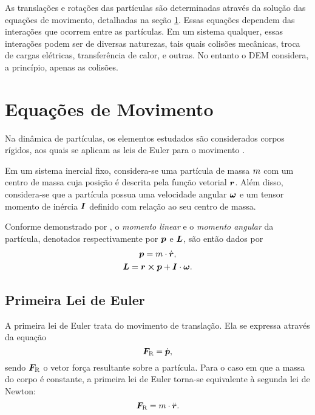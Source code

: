 As translações e rotações das partículas são determinadas através da solução das equações de movimento, detalhadas na seção \ref{sec:equations_of_motion}. Essas equações dependem das interações que ocorrem entre as partículas. Em um sistema qualquer, essas interações podem ser de diversas naturezas, tais quais colisões mecânicas, troca de cargas elétricas, transferência de calor, e outras. No entanto o DEM considera, a princípio, apenas as colisões.

\section{Equações de Movimento} \label{sec:equations_of_motion}

Na dinâmica de partículas, os elementos estudados são considerados corpos rígidos, aos quais se aplicam as leis de Euler para o movimento \cite{bib:sampaio, bib:dynamics_of_multibody_systems}.

Em um sistema inercial fixo, considera-se uma partícula de massa \(m\) com um centro de massa cuja posição é descrita pela função vetorial \(\bm{r}\). Além disso, considera-se que a partícula possua uma velocidade angular \(\bm{\omega}\) e um tensor momento de inércia \(\bm{I}\) definido com relação ao seu centro de massa.

Conforme demonstrado por , o \textit{momento linear} e o \textit{momento angular} da partícula, denotados respectivamente por \(\bm{p}\) e \(\bm{L}\), são então dados por
\begin{gather*}
	\linearMomentum = \mass\cdot\velocity, \\
	\angularMomentum = \position\cross\linearMomentum + \tensorOfInertia\cdot\angularVelocity.
\end{gather*}

\subsection{Primeira Lei de Euler}

A primeira lei de Euler trata do movimento de translação. Ela se expressa através da equação
\begin{equation} \label{eq:euler_first}
	\resultingForce = \deriv{1}{\linearMomentum},
\end{equation}
sendo \(\bm{F}_{\text{R}}\) o vetor força resultante sobre a partícula. Para o caso em que a massa do corpo é constante, a primeira lei de Euler torna-se equivalente à segunda lei de Newton:
\begin{equation} \label{eq:motion_first}
	\resultingForce = \mass\cdot\acceleration.
\end{equation}

